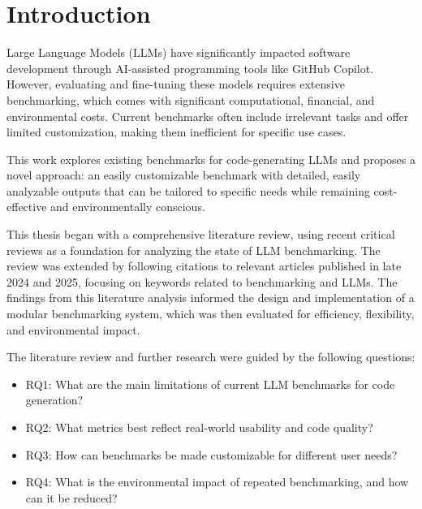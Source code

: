 
%
%

\section{Introduction}


Large Language Models (LLMs) have significantly impacted software development through AI-assisted programming tools like GitHub Copilot.
However, evaluating and fine-tuning these models requires extensive benchmarking, which comes with significant computational, financial, and environmental costs.
Current benchmarks often include irrelevant tasks and offer limited customization, making them inefficient for specific use cases.

This work explores existing benchmarks for code-generating LLMs and proposes a novel approach: an easily customizable benchmark with detailed, easily analyzable outputs that can be tailored to specific needs while remaining cost-effective and environmentally conscious.

This thesis began with a comprehensive literature review, using recent critical reviews as a foundation for analyzing the state of LLM benchmarking.
The review was extended by following citations to relevant articles published in late 2024 and 2025, focusing on keywords related to benchmarking and LLMs.
The findings from this literature analysis informed the design and implementation of a modular benchmarking system, which was then evaluated for efficiency, flexibility, and environmental impact.

The literature review and further research were guided by the following questions:
\begin{itemize}
    \item RQ1: What are the main limitations of current LLM benchmarks for code generation?
    \item RQ2: What metrics best reflect real-world usability and code quality?
    \item RQ3: How can benchmarks be made customizable for different user needs?
    \item RQ4: What is the environmental impact of repeated benchmarking, and how can it be reduced?
\end{itemize}

